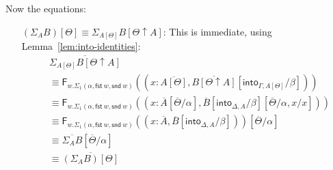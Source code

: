 \documentclass[10pt]{article}
\theoremstyle{definition}
\newcommand\dsd[1]{\ensuremath{\mathsf{#1}}}
\newcommand{\app}[2]{\ensuremath{#1 \: #2}}
\newcommand{\telety}[3]{\ensuremath{(#1{:}#2,#3)}}
\newcommand{\fst}[1]{\app{\dsd{fst}}{#1}}
\newcommand{\snd}[1]{\app{\dsd{snd}}{#1}}
\newcommand\F[2]{\ensuremath{\mathsf{F}_{#1}(#2)}}
\newcommand{\upstairs}[1]{\overline{#1}}
\newcommand\into[1]{\ensuremath{\mathsf{into}_{#1}}}
\begin{document}
Now the equations:
\begin{enumerate}[style = multiline, labelwidth = 80pt]
\item[{$(\Sigma_A B)[\Theta] \equiv \Sigma_{A[\Theta]} B[\Theta \uparrow A]$}:] This is immediate, using Lemma~\ref{lem:into-identities}:
\begin{align*}
&\upstairs{\Sigma_{A[\Theta]} B[\Theta \uparrow A]} \\
&\equiv \F{w. \Sigma_1(\alpha,\fst w, \snd w)}{\telety{x}{\upstairs{A[\Theta]}}{\upstairs{B[\Theta \uparrow A]}[\into{\Gamma, A[\Theta]}/\beta]}} \\
&\equiv \F{w. \Sigma_1(\alpha,\fst w, \snd w)}{\telety{x}{\upstairs{A}[\upstairs{\Theta}/\alpha]}{\upstairs{B}[\into{\Delta, A}/\beta][\upstairs{\Theta}/\alpha, x / x]}} \\
&\equiv \F{w. \Sigma_1(\alpha,\fst w, \snd w)}{\telety{x}{\upstairs{A}}{\upstairs{B}[\into{\Delta, A}/\beta]}}[\upstairs{\Theta}/\alpha] \\
&\equiv \upstairs{\Sigma_A B}[\upstairs{\Theta}/\alpha] \\
&\equiv \upstairs{(\Sigma_A B)[\Theta]}
\end{align*}


\end{enumerate}
\end{document}
